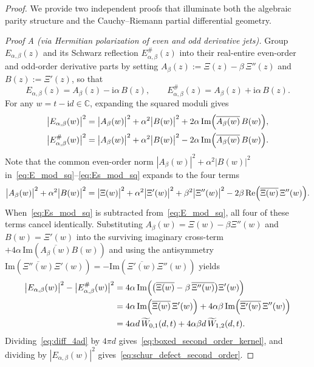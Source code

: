 \documentclass[11pt,reqno]{amsart}
\theoremstyle{definition}
\theoremstyle{remark}
\numberwithin{equation}{section}
\newcommand{\C}{\mathbb{C}}
\newcommand{\ii}{\mathrm{i}}
\newcommand{\Rea}{\mathrm{Re}}
\newcommand{\Ima}{\mathrm{Im}}
\begin{document}
\begin{proof}
We provide two independent proofs that illuminate both the algebraic parity structure and the Cauchy--Riemann partial differential geometry.

\textit{Proof A (via Hermitian polarization of even and odd derivative jets).} Group $E_{\alpha,\beta}(z)$ and its Schwarz reflection $E_{\alpha,\beta}^\#(z)$ into their real-entire even-order and odd-order derivative parts by setting $A_\beta(z) := \Xi(z) - \beta\,\Xi''(z)$ and $B(z) := \Xi'(z)$, so that
\begin{equation}\label{eq:A_beta_B_decomp}
E_{\alpha,\beta}(z) = A_\beta(z) - \ii\alpha\,B(z), \qquad E_{\alpha,\beta}^\#(z) = A_\beta(z) + \ii\alpha\,B(z).
\end{equation}
For any $w = t - \ii d \in \C$, expanding the squared moduli gives
\begin{align}
\bigl|E_{\alpha,\beta}(w)\bigr|^2 &= \bigl|A_\beta(w)\bigr|^2 + \alpha^2\bigl|B(w)\bigr|^2 + 2\alpha\,\Ima\Bigl(\overline{A_\beta(w)}\,B(w)\Bigr), \label{eq:E_mod_sq} \\
\bigl|E_{\alpha,\beta}^\#(w)\bigr|^2 &= \bigl|A_\beta(w)\bigr|^2 + \alpha^2\bigl|B(w)\bigr|^2 - 2\alpha\,\Ima\Bigl(\overline{A_\beta(w)}\,B(w)\Bigr). \label{eq:Es_mod_sq}
\end{align}
Note that the common even-order norm $|A_\beta(w)|^2 + \alpha^2|B(w)|^2$ in~\eqref{eq:E_mod_sq}--\eqref{eq:Es_mod_sq} expands to the four terms
\[
\bigl|A_\beta(w)\bigr|^2 + \alpha^2\bigl|B(w)\bigr|^2 = \bigl|\Xi(w)\bigr|^2 + \alpha^2\bigl|\Xi'(w)\bigr|^2 + \beta^2\bigl|\Xi''(w)\bigr|^2 - 2\beta\,\Rea\Bigl(\overline{\Xi(w)}\,\Xi''(w)\Bigr).
\]
When~\eqref{eq:Es_mod_sq} is subtracted from~\eqref{eq:E_mod_sq}, all four of these terms cancel identically. Substituting $A_\beta(w) = \Xi(w) - \beta\Xi''(w)$ and $B(w) = \Xi'(w)$ into the surviving imaginary cross-term $+4\alpha\,\Ima(\overline{A_\beta(w)}B(w))$ and using the antisymmetry $\Ima(\overline{\Xi''(w)}\Xi'(w)) = -\Ima(\overline{\Xi'(w)}\Xi''(w))$ yields
\begin{align}
\bigl|E_{\alpha,\beta}(w)\bigr|^2 - \bigl|E_{\alpha,\beta}^\#(w)\bigr|^2 &= 4\alpha\,\Ima\Bigl(\bigl(\overline{\Xi(w)} - \beta\,\overline{\Xi''(w)}\bigr)\Xi'(w)\Bigr) \nonumber \\
&= 4\alpha\,\Ima\Bigl(\overline{\Xi(w)}\,\Xi'(w)\Bigr) + 4\alpha\beta\,\Ima\Bigl(\overline{\Xi'(w)}\,\Xi''(w)\Bigr) \nonumber \\
&= 4\alpha d\,\widetilde{W}_{0,1}(d,t) + 4\alpha\beta d\,\widetilde{W}_{1,2}(d,t). \label{eq:diff_4ad}
\end{align}
Dividing~\eqref{eq:diff_4ad} by $4\pi d$ gives~\eqref{eq:boxed_second_order_kernel}, and dividing by $|E_{\alpha,\beta}(w)|^2$ gives~\eqref{eq:schur_defect_second_order}.


\end{proof}
\end{document}
